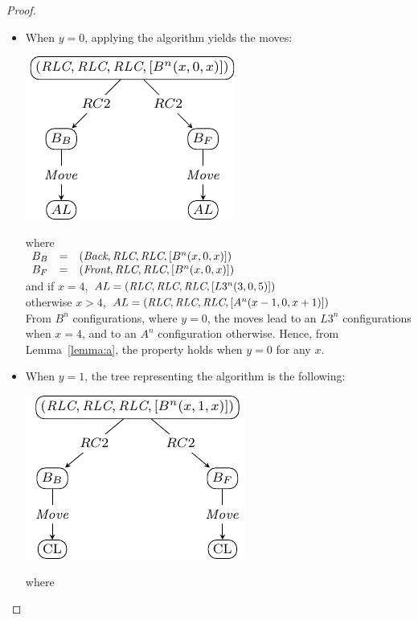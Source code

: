 \begin{proof}
\begin{itemize}[parsep=0cm, itemsep=0cm, topsep=0cm]
\item When $y=0$, applying the algorithm yields the moves: \\
		\begin{center}
		\includegraphics[scale=1]{figures/figBx0y4}
		\end{center}
	where \\
$\begin{array}{l c l}
	B_B & = &(\textit{Back}, \textit{RLC}, \textit{RLC}, [B^n(x, 0, x)])\\
	B_F & = &(\textit{Front}, \textit{RLC}, \textit{RLC}, [B^n(x, 0, x)]) 
\end{array}$\\
and if $x=4$, $AL =(\textit{RLC}, \textit{RLC}, \textit{RLC}, [L3^n(3, 0, 5)])$\\
otherwise $x>4$, $AL = (\textit{RLC}, \textit{RLC}, \textit{RLC}, [A^n(x-1, 0, x+1)])$\\
From $B^n$ configurations, where $y=0$, the moves lead to an $L3^n$ 
configurations when $x=4$, and to an $A^n$ configuration otherwise.
Hence,  from Lemma~\ref{lemma:a}, the property holds when $y=0$ for any $x$.
\item When $y=1$, the tree representing the algorithm is the following:\\
		\begin{center}
		\includegraphics[scale=1]{figures/figBx1y3}
		\end{center}
		where\\

\end{itemize}
\end{proof}

